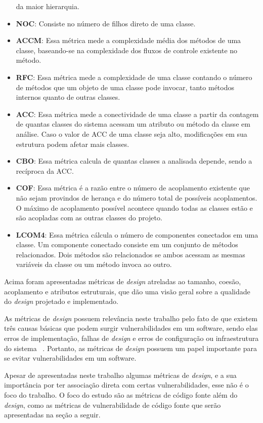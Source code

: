 \begin{itemize}
    da maior hierarquia.
  \item \textbf{NOC}: Consiste no número de filhos direto de uma classe.
  \item \textbf{ACCM}: Essa métrica mede a complexidade média dos métodos de uma classe, baseando-se na complexidade dos fluxos 
    de controle existente no método.
  \item \textbf{RFC}: Essa métrica mede a complexidade de uma classe contando o número de métodos que um objeto de uma classe 
    pode invocar, tanto métodos internos quanto de outras classes.
  \item \textbf{ACC}: Essa métrica mede a conectividade de uma classe a partir da contagem de quantas classes do sistema 
    acessam um atributo ou método da classe em análise. Caso o valor de ACC de uma classe seja alto, modificações em sua 
    estrutura podem afetar mais classes.
  \item \textbf{CBO}: Essa métrica calcula de quantas classes a analisada depende, sendo a recíproca da ACC.
  \item \textbf{COF}: Essa métrica é a razão entre o número de acoplamento existente que não sejam provindos de herança e do 
    número total de possíveis acoplamentos. O máximo de acoplamento possível acontece quando todas as classes estão e são 
    acopladas com as outras classes do projeto.
  \item \textbf{LCOM4}: Essa métrica cálcula o número de componentes conectados em uma classe. Um componente conectado consiste 
    em um conjunto de métodos relacionados. Dois métodos são relacionados se ambos acessam as mesmas variáveis da classe ou um 
    método invoca ao outro.
\end{itemize}

Acima foram apresentadas métricas de \textit{design} atreladas ao tamanho,
coesão, acoplamento e atributos estruturais, que dão uma
visão geral sobre a qualidade do \textit{design} projetado e implementado.

As métricas de \textit{design} possuem relevância neste trabalho pelo fato de que existem três causas básicas que podem surgir 
vulnerabilidades em um software, sendo elas erros de implementação, falhas de
\textit{design} e erros de configuração ou infraestrutura
do sistema ~\cite{malerba2010}. Portanto, as métricas de \textit{design} possuem um papel importante para se 
evitar vulnerabilidades em um software.

Apesar de apresentadas neste trabalho algumas métricas de \textit{design}, 
e a sua importância por ter associação direta com certas
vulnerabilidades, esse não é o foco do trabalho. O foco do estudo são as
métricas de código fonte além do \textit{design}, como as métricas de vulnerabilidade de código fonte que serão 
apresentadas na seção a seguir.

